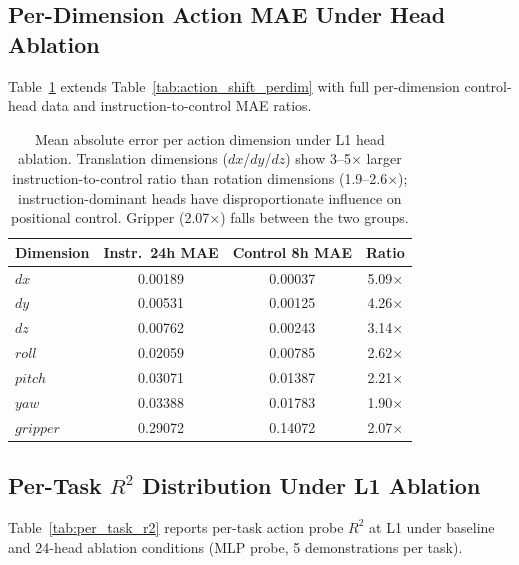 \subsection{Per-Dimension Action MAE Under Head Ablation}
Table~\ref{tab:per_dim_mae} extends Table~\ref{tab:action_shift_perdim} with full per-dimension control-head data and instruction-to-control MAE ratios.

\begin{table}[h]
\centering
\caption{Mean absolute error per action dimension under L1 head ablation. Translation dimensions ($dx$/$dy$/$dz$) show 3--5$\times$ larger instruction-to-control ratio than rotation dimensions (1.9--2.6$\times$); instruction-dominant heads have disproportionate influence on positional control. Gripper (2.07$\times$) falls between the two groups.}
\label{tab:per_dim_mae}
\small
\begin{tabular}{lccc}
\toprule
\textbf{Dimension} & \textbf{Instr.\ 24h MAE} & \textbf{Control 8h MAE} & \textbf{Ratio} \\
\midrule
$dx$ & 0.00189 & 0.00037 & 5.09$\times$ \\
$dy$ & 0.00531 & 0.00125 & 4.26$\times$ \\
$dz$ & 0.00762 & 0.00243 & 3.14$\times$ \\
$roll$ & 0.02059 & 0.00785 & 2.62$\times$ \\
$pitch$ & 0.03071 & 0.01387 & 2.21$\times$ \\
$yaw$ & 0.03388 & 0.01783 & 1.90$\times$ \\
$gripper$ & 0.29072 & 0.14072 & 2.07$\times$ \\
\bottomrule
\end{tabular}
\end{table}

\subsection{Per-Task $R^2$ Distribution Under L1 Ablation}
Table~\ref{tab:per_task_r2} reports per-task action probe $R^2$ at L1 under baseline and 24-head ablation conditions (MLP probe, 5 demonstrations per task).


